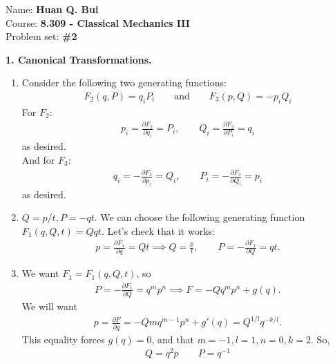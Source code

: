 \documentclass{article}
\theoremstyle{definition}
\newcommand{\p}{\partial}
\newcommand{\f}[2]{\frac{#1}{#2}}
\begin{document}
	
\begin{framed}
	\noindent Name: \textbf{Huan Q. Bui}\\
	Course: \textbf{8.309 - Classical Mechanics III}\\
	Problem set: \textbf{\#2}
\end{framed}


\noindent \textbf{1. Canonical Transformations.}


\begin{enumerate}[label=(\alph*)]
	\item Consider the following two generating functions:
	\begin{align*}
	\boxed{F_2(q,P) = q_iP_i \quad\quad\text{and}\quad\quad F_3(p,Q) = -p_iQ_i}
	\end{align*}
	For $F_2$:
	\begin{align*}
	p_i = \f{\p F_2}{\p q_i} = P_i, \quad\quad Q_i = \f{\p F_2}{\p P_i} = q_i
	\end{align*}
	as desired. \\
	
	And for $F_3$:
	\begin{align*}
	q_i = -\f{\p F_3}{\p p_i} = Q_i, \quad\quad P_i = -\f{\p F_3}{\p Q_i} = p_i
	\end{align*}
	as desired. 
	
	
	\item $Q = p/t, P = -qt$. We can choose the following generating function $\boxed{F_1(q,Q,t) = Qqt}$. Let's check that it works:
	\begin{align*}
	p = \f{\p F_1}{\p q} = Qt \implies Q = \f{p}{t},\quad\quad P = -\f{\p F_1}{\p Q} = qt.
	\end{align*}
	
	
	\item We want $F_1 = F_1(q,Q,t)$, so 
	\begin{align*}
	P = -\f{\p F_1}{\p Q} = q^m p^n \implies F = -Qq^m p^n + g(q).
	\end{align*}
	We will want
	\begin{align*}
	p = \f{\p F}{\p q} = -Q m q^{m-1} p^n + g'(q) = Q^{1/l}q^{-k/l}.
	\end{align*}
	This equality forces $g(q) = 0$, and that $m=-1,l=1,n=0,k=2$. So,
	\begin{align*}
	\boxed{Q = q^2p \quad\quad P = q^{-1}}
	\end{align*}
	

\end{enumerate}
\end{document}
